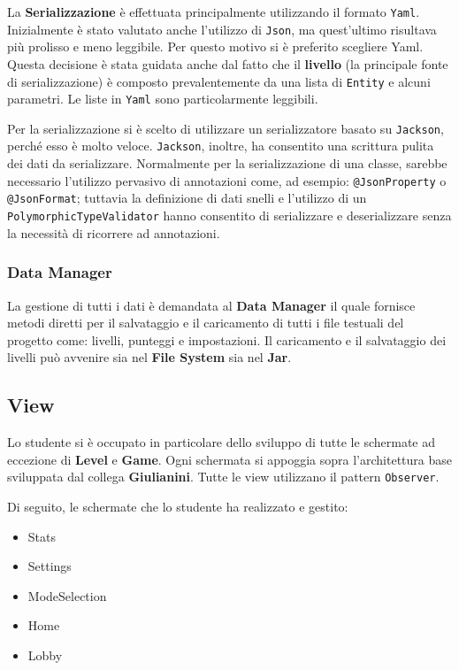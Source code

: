     La \textbf{Serializzazione} è effettuata principalmente utilizzando il formato 
    \texttt{Yaml}. Inizialmente è stato valutato anche l'utilizzo di \texttt{Json}, ma quest'ultimo risultava più prolisso e meno leggibile. Per questo motivo si è preferito scegliere Yaml.
    Questa decisione è stata guidata anche dal fatto che il \textbf{livello} (la principale fonte di serializzazione) è composto prevalentemente da una lista di \texttt{Entity} e alcuni parametri. Le liste in  \texttt{Yaml} sono particolarmente leggibili.
    
    Per la serializzazione si è scelto di utilizzare un serializzatore basato su \texttt{Jackson}, perché esso è molto veloce.
    \texttt{Jackson}, inoltre, ha consentito una scrittura pulita dei dati da serializzare.
    Normalmente per la serializzazione di una classe, sarebbe necessario l'utilizzo pervasivo di annotazioni come, ad esempio: \texttt{@JsonProperty} o \texttt{@JsonFormat}; tuttavia la definizione di dati snelli e l'utilizzo di un \texttt{PolymorphicTypeValidator} hanno consentito di serializzare e deserializzare senza la necessità di ricorrere ad annotazioni.
    
    \subsubsection{Data Manager}
    La gestione di tutti i dati è demandata al \textbf{Data Manager}
    il quale fornisce metodi diretti per il salvataggio e il caricamento di tutti i file testuali del progetto come: livelli, punteggi e impostazioni.
    Il caricamento e il salvataggio dei livelli può avvenire sia nel \textbf{File System} sia nel \textbf{Jar}.
    
    
    \subsection{View}
    Lo studente si è occupato in particolare dello sviluppo di tutte le schermate ad eccezione di \textbf{Level} e \textbf{Game}.
    Ogni schermata si appoggia sopra l'architettura base sviluppata dal collega \textbf{Giulianini}. Tutte le view utilizzano il pattern \texttt{Observer}.
    
    Di seguito, le schermate che lo studente ha realizzato e gestito:
        \begin{itemize}
	        \item Stats
	        \item Settings
	        \item ModeSelection
            \item Home
            \item Lobby
        \end{itemize}

